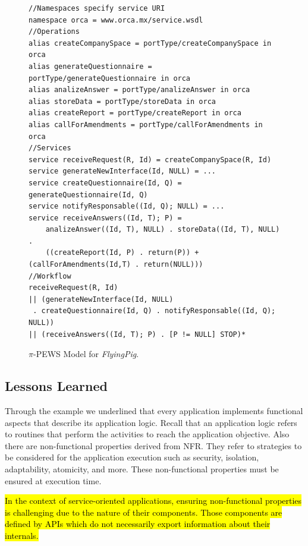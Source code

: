 \documentclass{singlecol-new}
\theoremstyle{TH}{
\newtheorem{lemma}{Lemma}
\newtheorem{theorem}[lemma]{Theorem}
\newtheorem{corrolary}[lemma]{Corrolary}
\newtheorem{conjecture}[lemma]{Conjecture}
\newtheorem{proposition}[lemma]{Proposition}
\newtheorem{claim}[lemma]{Claim}
\newtheorem{stheorem}[lemma]{Wrong Theorem}
\newtheorem{algorithm}{Algorithm}
}
\theoremstyle{THrm}{
\newtheorem{definition}{Definition}[section]
\newtheorem{question}{Question}[section]
\newtheorem{remark}{Remark}
\newtheorem{scheme}{Scheme}
}
\theoremstyle{THhit}{
\newtheorem{case}{Case}[section]
}
\theoremstyle{THhsl}{
\newtheorem{example}{Example}
}
\def\FlyingPig{\textsl{FlyingPig}\xspace}
\begin{document}
\begin{figure}[h]
\begin{scriptsize}
\begin{verbatim}
//Namespaces specify service URI
namespace orca = www.orca.mx/service.wsdl
//Operations
alias createCompanySpace = portType/createCompanySpace in orca
alias generateQuestionnaire = portType/generateQuestionnaire in orca
alias analizeAnswer = portType/analizeAnswer in orca
alias storeData = portType/storeData in orca
alias createReport = portType/createReport in orca
alias callForAmendments = portType/callForAmendments in orca
//Services
service receiveRequest(R, Id) = createCompanySpace(R, Id)
service generateNewInterface(Id, NULL) = ...
service createQuestionnaire(Id, Q) = generateQuestionnaire(Id, Q)
service notifyResponsable((Id, Q); NULL) = ...
service receiveAnswers((Id, T); P) =
	analizeAnswer((Id, T), NULL) . storeData((Id, T), NULL) . 
	((createReport(Id, P) . return(P)) + (callForAmendments(Id,T) . return(NULL)))
//Workflow
receiveRequest(R, Id)
|| (generateNewInterface(Id, NULL)
 . createQuestionnaire(Id, Q) . notifyResponsable((Id, Q); NULL))
|| (receiveAnswers((Id, T); P) . [P != NULL] STOP)*	
\end{verbatim}
\caption{$\pi$-PEWS Model for \FlyingPig.}\label{fig:piPEWSFlyingPig}
\end{scriptsize}
\end{figure}


\subsection{Lessons Learned}

Through the example we underlined that every application implements functional aspects that describe its application logic.
Recall that an application logic refers to routines that perform the activities to reach the application objective.
Also there are non-functional properties derived from NFR. 
They refer to strategies to be considered for the application execution such as security, isolation, adaptability, atomicity, and more.
These non-functional properties must be ensured at execution time.

\hl{In the context of service-oriented applications, ensuring non-functional properties is challenging due to the nature of their components.
Those components are defined by APIs which do not necessarily export information about their internals.}
\end{document}
